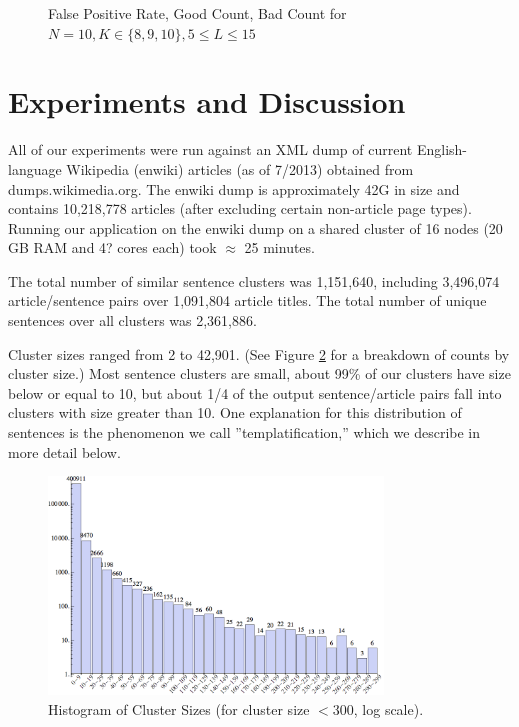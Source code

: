\documentclass{acm_proc_article-sp}
\begin{document}
\begin{figure}
\centering
{}
\caption{False Positive Rate, Good Count, Bad Count for $N=10, K \in \{8,9,10\}, 5 \le L \le 15$}
\label{ed-grid}
\end{figure}

\section{Experiments and Discussion}


All of our experiments were run against an XML dump of current English-language Wikipedia (enwiki) articles (as of 7/2013) obtained from dumps.wikimedia.org. The enwiki dump is approximately 42G in size and contains 10,218,778 articles (after excluding certain non-article page types). Running our application on the enwiki dump on a shared cluster of 16 nodes (20 GB RAM and 4? cores each) took $\approx$ 25 minutes.

The total number of similar sentence clusters was 1,151,640, including 3,496,074 article/sentence pairs over 1,091,804 article titles. The total number of unique sentences over all clusters was 2,361,886.

Cluster sizes ranged from 2 to 42,901. (See Figure \ref{clust} for a breakdown of counts by cluster size.) Most sentence clusters are small, about 99\% of our clusters have size below or equal to 10, but about 1/4 of the output sentence/article pairs fall into clusters with size greater than 10. One explanation for this distribution of sentences is the phenomenon we call ''templatification,'' which we describe in more detail below.

\begin{figure}
\centering
\includegraphics[width=3.5in, keepaspectratio = true]{clusterhistogram.png}
\caption{Histogram of Cluster Sizes (for cluster size $< 300$, log scale).}
\label{clust}
\end{figure}
\end{document}
